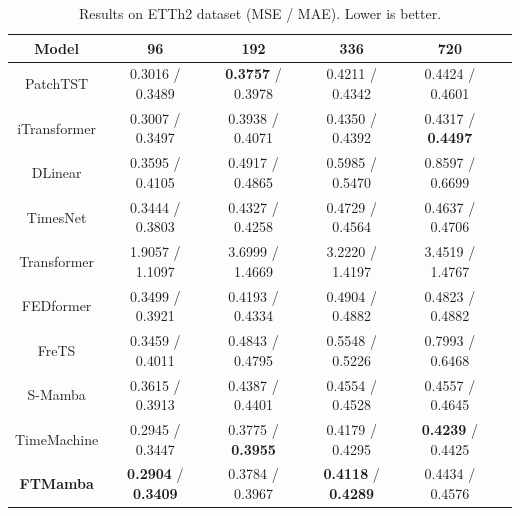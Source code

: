 \documentclass[electronics,article,submit,pdftex,moreauthors]{Definitions/mdpi}
\begin{document}
\begin{table}[H]
\caption{Results on ETTh2 dataset (MSE / MAE). Lower is better.\label{tab:etth2}}
\begin{tabularx}{\textwidth}{CCCCCC}
\toprule
\textbf{Model} & \textbf{96} & \textbf{192} & \textbf{336} & \textbf{720} \\
\midrule
PatchTST      & 0.3016 / 0.3489  & \textbf{0.3757} / 0.3978  & 0.4211 / 0.4342  & 0.4424 / 0.4601  \\
iTransformer  & 0.3007 / 0.3497  & 0.3938 / 0.4071  & 0.4350 / 0.4392  & 0.4317 / \textbf{0.4497}  \\
DLinear       & 0.3595 / 0.4105  & 0.4917 / 0.4865  & 0.5985 / 0.5470  & 0.8597 / 0.6699  \\
TimesNet      & 0.3444 / 0.3803  & 0.4327 / 0.4258  & 0.4729 / 0.4564  & 0.4637 / 0.4706  \\
Transformer   & 1.9057 / 1.1097  & 3.6999 / 1.4669  & 3.2220 / 1.4197  & 3.4519 / 1.4767  \\
FEDformer     & 0.3499 / 0.3921  & 0.4193 / 0.4334  & 0.4904 / 0.4882  & 0.4823 / 0.4882  \\
FreTS         & 0.3459 / 0.4011  & 0.4843 / 0.4795  & 0.5548 / 0.5226  & 0.7993 / 0.6468  \\
S-Mamba       & 0.3615 / 0.3913  & 0.4387 / 0.4401  & 0.4554 / 0.4528  & 0.4557 / 0.4645  \\
TimeMachine   & 0.2945 / 0.3447  & 0.3775 / \textbf{0.3955}  & 0.4179 / 0.4295  & \textbf{0.4239} / 0.4425  \\
\textbf{FTMamba}  & \textbf{0.2904} / \textbf{0.3409} & 0.3784 / 0.3967  & \textbf{0.4118} / \textbf{0.4289} & 0.4434 / 0.4576  \\
\bottomrule
\end{tabularx}
\end{table}
\end{document}
